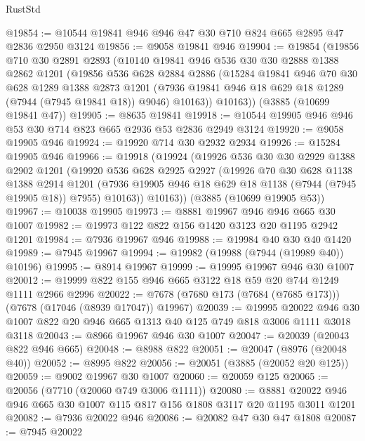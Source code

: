 \begin{lexlean}{RustStd}
\begin{coremodule}
@19854 := @10544 @19841 @946 @946 @47 @30 @710 @824 @665 @2895 @47 @2836 @2950 @3124
@19856 := @9058 @19841 @946
@19904 := @19854
    (@19856
      @710
      @30
      @2891
      @2893
      (@10140
        @19841
        @946
        @536
        @30
        @30
        @2888
        @1388
        @2862
        @1201
        (@19856
          @536
          @628
          @2884
          @2886
          (@15284
            @19841
            @946
            @70
            @30
            @628
            @1289
            @1388
            @2873
            @1201
            (@7936 @19841 @946 @18 @629 @18 @1289 (@7944 (@7945 @19841 @18)) @9046)
            @10163))
        @10163))
    (@3885 (@10699 @19841 @47))
@19905 := @8635 @19841
@19918 := @10544 @19905 @946 @946 @53 @30 @714 @823 @665 @2936 @53 @2836 @2949 @3124
@19920 := @9058 @19905 @946
@19924 := @19920 @714 @30 @2932 @2934
@19926 := @15284 @19905 @946
@19966 := @19918
    (@19924
      (@19926
        @536
        @30
        @30
        @2929
        @1388
        @2902
        @1201
        (@19920
          @536
          @628
          @2925
          @2927
          (@19926
            @70
            @30
            @628
            @1138
            @1388
            @2914
            @1201
            (@7936 @19905 @946 @18 @629 @18 @1138 (@7944 (@7945 @19905 @18)) @7955)
            @10163))
        @10163))
    (@3885 (@10699 @19905 @53))
@19967 := @10038 @19905
@19973 := @8881 @19967 @946 @946 @665 @30 @1007
@19982 := @19973 @122 @822 @156 @1420 @3123 @20 @1195 @2942 @1201
@19984 := @7936 @19967 @946
@19988 := @19984 @40 @30 @40 @1420
@19989 := @7945 @19967
@19994 := @19982 (@19988 (@7944 (@19989 @40)) @10196)
@19995 := @8914 @19967
@19999 := @19995 @19967 @946 @30 @1007
@20012 := @19999 @822 @155 @946 @665 @3122 @18 @59 @20 @744 @1249 @1111 @2966 @2996
@20022 := @7678 (@7680 @173 (@7684 (@7685 @173))) (@7678 (@17046 (@8939 @17047)) @19967)
@20039 := @19995
    @20022
    @946
    @30
    @1007
    @822
    @20
    @946
    @665
    @1313
    @40
    @125
    @749
    @818
    @3006
    @1111
    @3018
    @3118
@20043 := @8966 @19967 @946 @30 @1007
@20047 := @20039 (@20043 @822 @946 @665)
@20048 := @8988 @822
@20051 := @20047 (@8976 (@20048 @40))
@20052 := @8995 @822
@20056 := @20051 (@3885 (@20052 @20 @125))
@20059 := @9002 @19967 @30 @1007
@20060 := @20059 @125
@20065 := @20056 (@7710 (@20060 @749 @3006 @1111))
@20080 := @8881 @20022 @946 @946 @665 @30 @1007 @115 @817 @156 @1808 @3117 @20 @1195 @3011 @1201
@20082 := @7936 @20022 @946
@20086 := @20082 @47 @30 @47 @1808
@20087 := @7945 @20022

\end{coremodule}
\end{lexlean}
